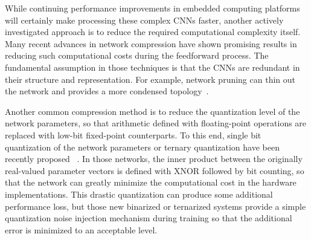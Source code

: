 

While continuing performance improvements in embedded computing
platforms will certainly make processing these complex CNNs faster,
another actively investigated approach is to reduce the required
computational complexity itself.
Many recent advances in network compression have shown promising results
in reducing such computational costs during the feedforward
process. The fundamental assumption in those techniques is that the
CNNs are redundant in their structure and representation. For example,
network pruning can thin out the network and provides a more condensed
topology~\cite{han2015deep}.

Another common compression method is to reduce the
quantization level of the network parameters, so that arithmetic
defined with floating-point operations are replaced with low-bit
fixed-point counterparts. To this end, single bit quantization of the
network parameters or ternary quantization have been recently proposed
~\cite{hwang2014fixed,soudry2014expectation,kim2016bitwise,rastegari2016xnor,hubara2016binarized,beauchamp2006embedded,govindu2004analysis}.
In those networks, the inner product between the
originally real-valued parameter vectors is defined with XNOR followed
by bit counting, so that the network can greatly minimize the
computational cost in the hardware implementations. This drastic
quantization can produce some additional performance loss, but those
new binarized or ternarized systems provide a simple quantization
noise injection mechanism during training so that the additional error
is minimized to an acceptable level.

